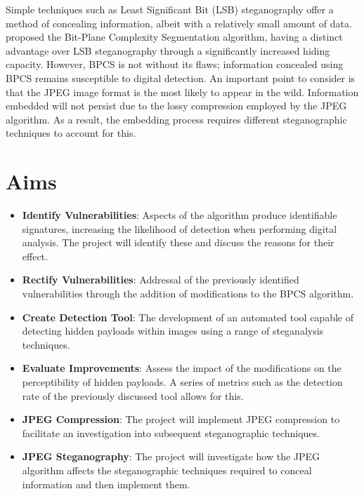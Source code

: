 \documentclass{l4proj}
\begin{document}
Simple techniques such as Least Significant Bit (LSB) steganography offer a method of concealing information, albeit with a relatively small amount of data. \citet{Kawaguchi1999PrinciplesAA} proposed the Bit-Plane Complexity Segmentation algorithm, having a distinct advantage over LSB steganography through a significantly increased hiding capacity. However, BPCS is not without its flaws; information concealed using BPCS remains susceptible to digital detection. An important point to consider is that the JPEG image format is the most likely to appear in the wild. Information embedded will not persist due to the lossy compression employed by the JPEG algorithm. As a result, the embedding process requires different steganographic techniques to account for this. 

 
\section{Aims}

\begin{itemize}
    \item \textbf{Identify Vulnerabilities}: Aspects of the algorithm produce identifiable signatures, increasing the likelihood of detection when performing digital analysis. The project will identify these and discuss the reasons for their effect.
    \item \textbf{Rectify Vulnerabilities}:  Addressal of the previously identified vulnerabilities through the addition of modifications to the BPCS algorithm.
    \item \textbf{Create Detection Tool}: The development of an automated tool capable of detecting hidden payloads within images using a range of steganalysis techniques. 
    \item \textbf{Evaluate Improvements}: Assess the impact of the modifications on the perceptibility of hidden payloads. A series of metrics such as the detection rate of the previously discussed tool allows for this. 
    \item \textbf{JPEG Compression}: The project will implement JPEG compression to facilitate an investigation into subsequent steganographic techniques.
    \item \textbf{JPEG Steganography}: The project will investigate how the JPEG algorithm affects the steganographic techniques required to conceal information and then implement them. 
\end{itemize}
\end{document}
